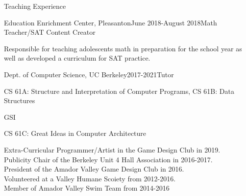 \documentclass{resume} %
\begin{document}

\begin{rSection}{Teaching Experience} 
\begin{rSubsection}{Education Enrichment Center, Pleasanton}{June 2018-August 2018}{Math Teacher/SAT Content Creator}{}
    \item Responsible for teaching adolescents math in preparation for the school year as well as developed a curriculum for SAT practice.
\end{rSubsection}

\begin{rSubsection}{Dept. of Computer Science, UC Berkeley}{2017-2021}{Tutor}{}
    \item CS 61A: Structure and Interpretation of Computer Programs, CS 61B: Data Structures
\end{rSubsection}

\begin{rSubsubsection}{GSI}{}
    \item CS 61C: Great Ideas in Computer Architecture
\end{rSubsubsection}

\end{rSection}

\begin{rSection}{Extra-Curricular} \itemsep -3pt
Programmer/Artist in the Game Design Club in 2019. \\
Publicity Chair of the Berkeley Unit 4 Hall Association in 2016-2017. \\
President of the Amador Valley Game Design Club in 2016. \\
Volunteered at a Valley Humane Scoiety from 2012-2016. \\
Member of Amador Valley Swim Team from 2014-2016
\end{rSection}

%
\end{document}
